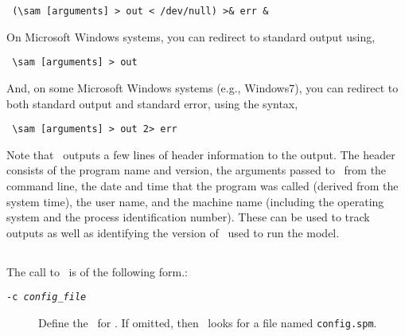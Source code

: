\begin{verbatim} (\sam [arguments] > out < /dev/null) >& err &\end{verbatim}

On Microsoft Windows systems, you can redirect to standard output using,

\begin{verbatim} \sam [arguments] > out\end{verbatim}

And, on some Microsoft Windows systems (e.g., Windows7), you can redirect to both standard output and standard error, using the syntax, 

\begin{verbatim} \sam [arguments] > out 2> err\end{verbatim}

Note that \SAM\ outputs a few lines of header information to the output. The header consists of the program name and version, the arguments passed to \SAM\ from the command line, the date and time that the program was called (derived from the system time), the user name, and the machine name (including the operating system and the process identification number). These can be used to track outputs as well as identifying the version of \SAM\ used to run the model.

\subsection{\label{sec:command-line-arguments}}
\CH
The call to \SAM\ is of the following form.: 

\texttt{}

\begin{description}
  \item [\texttt{-c \emph{config\_file}}] Define the \config\ for \SAM. If omitted, then \SAM\ looks for a file named \texttt{config.spm}.
\end{description}

